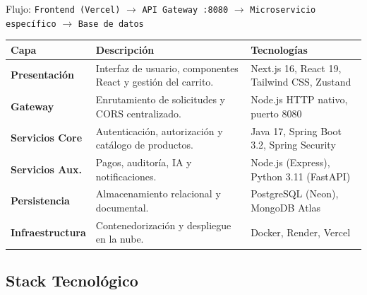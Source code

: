 \documentclass[12pt,a4paper]{article}
\begin{document}
\medskip
Flujo: \texttt{Frontend (Vercel)} $\longrightarrow$ \texttt{API Gateway :8080}
$\longrightarrow$ \texttt{Microservicio espec\'ifico} $\longrightarrow$ \texttt{Base de datos}

\begin{center}
\begin{tabular}{|L{3.2cm}|L{4.5cm}|L{5.8cm}|}
\hline
{}
\color{white}\textbf{Capa} &
\color{white}\textbf{Descripci\'on} &
\color{white}\textbf{Tecnolog\'ias} \\
\hline
\textbf{Presentaci\'on} &
Interfaz de usuario, componentes React y gesti\'on del carrito. &
Next.js 16, React 19, Tailwind CSS, Zustand \\
\hline
\textbf{Gateway} &
Enrutamiento de solicitudes y CORS centralizado. &
Node.js HTTP nativo, puerto 8080 \\
\hline
\textbf{Servicios Core} &
Autenticaci\'on, autorizaci\'on y cat\'alogo de productos. &
Java 17, Spring Boot 3.2, Spring Security \\
\hline
\textbf{Servicios Aux.} &
Pagos, auditor\'ia, IA y notificaciones. &
Node.js (Express), Python 3.11 (FastAPI) \\
\hline
\textbf{Persistencia} &
Almacenamiento relacional y documental. &
PostgreSQL (Neon), MongoDB Atlas \\
\hline
\textbf{Infraestructura} &
Contenedorizaci\'on y despliegue en la nube. &
Docker, Render, Vercel \\
\hline
\end{tabular}
\end{center}

\subsection{Stack Tecnol\'ogico}
\end{document}
